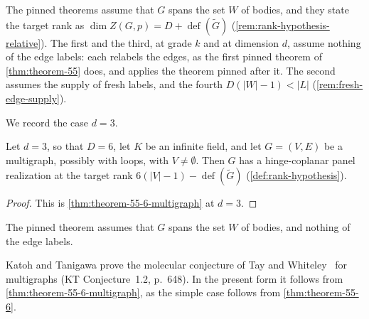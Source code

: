 \begin{fmlnote}
  The pinned theorems assume that $G$ spans the set $W$ of bodies, and
  they state the target rank as
  $\dim Z(G,p) = D + \operatorname{def}(\tilde G)$
  (\cref{rem:rank-hypothesis-relative}). The first and the third, at
  grade $k$ and at dimension $d$, assume nothing of the edge labels:
  each relabels the edges, as the first pinned theorem of
  \cref{thm:theorem-55} does, and applies the theorem pinned after it.
  The second assumes the supply of fresh labels, and the fourth
  $D(|W| - 1) < |L|$ (\cref{rem:fresh-edge-supply}).
\end{fmlnote}

We record the case $d = 3$.

\begin{corollary}[KT Theorem 5.6 for multigraphs at $d = 3$]
  \label{cor:theorem-55-6-multigraph-d3}
  \leanok
  Let $d = 3$, so that $D = 6$, let $K$ be an infinite field, and let
  $G = (V, E)$ be a multigraph, possibly with loops, with
  $V \neq \emptyset$. Then $G$ has a hinge-coplanar panel realization at
  the target rank $6(|V| - 1) - \operatorname{def}(\tilde G)$
  (\cref{def:rank-hypothesis}).
\end{corollary}
\begin{proof}
  \leanok
  This is \cref{thm:theorem-55-6-multigraph} at $d = 3$.
\end{proof}

\begin{fmlnote}
  The pinned theorem assumes that $G$ spans the set $W$ of bodies, and
  nothing of the edge labels.
\end{fmlnote}

Katoh and Tanigawa prove the molecular conjecture of Tay and
Whiteley~\cite{tayWhiteley1984} for multigraphs (KT Conjecture~1.2,
p.~648). In the present form it follows from
\cref{thm:theorem-55-6-multigraph}, as the simple case follows from
\cref{thm:theorem-55-6}.

